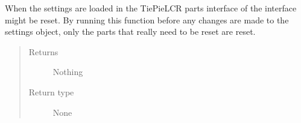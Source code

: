 \documentclass[letterpaper,10pt,english]{sphinxmanual}
\begin{document}
\begin{fulllineitems}

\begin{fulllineitems}
\label{\detokenize{index:TiePieLCR_settings.TiePieLCR_settings.reference_update_required}}
\end{fulllineitems}


\begin{fulllineitems}
\label{\detokenize{index:TiePieLCR_settings.TiePieLCR_settings.reset}}
\sphinxAtStartPar
When the settings are loaded in the TiePieLCR parts interface of the interface might be reset. By running this function before any changes are made to the settings object, only the parts that really need to be reset are reset.
\begin{quote}\begin{description}
\item[{Returns}] \leavevmode
\sphinxAtStartPar
Nothing

\item[{Return type}] \leavevmode
\sphinxAtStartPar
None

\end{description}\end{quote}

\end{fulllineitems}


\begin{fulllineitems}
\label{\detokenize{index:TiePieLCR_settings.TiePieLCR_settings.restart_required}}
\end{fulllineitems}



\end{fulllineitems}
\end{document}
